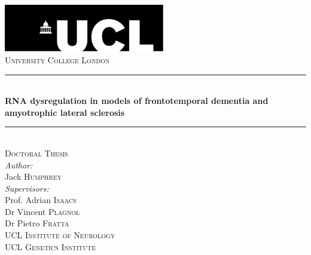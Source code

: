 
\begin{titlepage}%
\newcommand{\HRule}{\rule{\linewidth}{0.5mm}}

\center 

\includegraphics[width=7cm]{Figures/misc/ucllogo.jpg}\\[1cm]
\textsc{\LARGE University College London}\\[2cm] %
\HRule \\[1cm]
{ \huge \bfseries RNA dysregulation in models of frontotemporal dementia and amyotrophic lateral sclerosis}\\[0.4cm] 
\HRule \\[2cm]


\textsc{\Large Doctoral Thesis}\\[1.5cm] %


\emph{Author:}\\
Jack \textsc{Humphrey}\\[1cm] %

\emph{Supervisors:} \\
Prof. Adrian \textsc{Isaacs}\\ 
Dr Vincent \textsc{Plagnol}\\ 
Dr Pietro \textsc{Fratta}\\[1cm]


\textsc{\Large UCL Institute of Neurology}\\[0.5cm] %
\textsc{\Large UCL Genetics Institute}\\[2cm] %




\vfill %

\end{titlepage}%
\cleardoublepage

